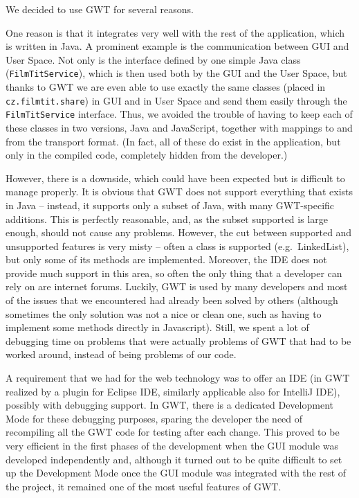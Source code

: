 
We decided to use GWT for several reasons.

One reason is that it integrates very well with the rest of the application, which is written in Java. A prominent example is the communication between GUI and User Space. Not only is the interface defined by one simple Java class ({\tt FilmTitService}), which is then used both by the GUI and the User Space, but thanks to GWT we are even able to use exactly the same classes (placed in {\tt cz.filmtit.share}) in GUI and in User Space and send them easily through the {\tt FilmTitService} interface. Thus, we avoided the trouble of having to keep each of these classes in two versions, Java and JavaScript, together with mappings to and from the transport format. (In fact, all of these do exist in the application, but only in the compiled code, completely hidden from the developer.)

However, there is a downside, which could have been expected but is difficult to manage properly. It is obvious that GWT does not support everything that exists in Java -- instead, it supports only a subset of Java, with many GWT-specific additions. This is perfectly reasonable, and, as the subset supported is large enough, should not cause any problems. However, the cut between supported and unsupported features is very misty -- often a class is supported (e.g.\ LinkedList), but only some of its methods are implemented. Moreover, the IDE does not provide much support in this area, so often the only thing that a developer can rely on are internet forums. Luckily, GWT is used by many developers and most of the issues that we encountered had already been solved by others (although sometimes the only solution was not a nice or clean one, such as having to implement some methods directly in Javascript). Still, we spent a lot of debugging time on problems that were actually problems of GWT that had to be worked around, instead of being problems of our code.

A requirement that we had for the web technology was to offer an IDE (in GWT realized by a plugin for Eclipse IDE, similarly applicable also for IntelliJ IDE), possibly with debugging support. In GWT, there is a dedicated Development Mode for these debugging purposes, sparing the developer the need of recompiling all the GWT code for testing after each change. This proved to be very efficient in the first phases of the development when the GUI module was developed independently and, although it turned out to be quite difficult to set up the Development Mode once the GUI module was integrated with the rest of the project, it remained one of the most useful features of GWT.

